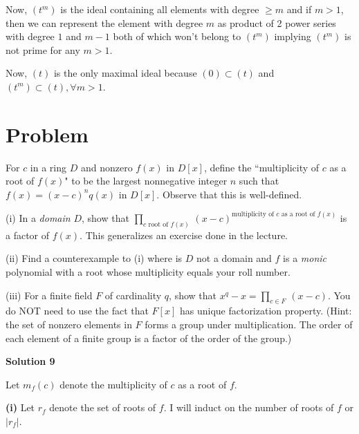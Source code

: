 \documentclass[12pt,a4paper]{article}
\theoremstyle{definition}
\begin{document}
\begin{flushleft}
\medskip

Now, $(t^m)$ is the ideal containing all elements with degree $\ge m$ and if $m >1$, then we can represent the element with degree $m$ as product of 2 power series with degree $1$ and $m-1$ both of which won't belong to $(t^m)$ implying $(t^m)$ is not prime for any $m>1$.

\medskip

Now, $(t)$ is the only maximal ideal because $(0) \subset (t)$ and $(t^m) \subset (t),\forall m > 1$.

\newpage

\setcounter{section}{8}
\section{Problem}

For $c$ in a ring $D$ and nonzero $f(x)$ in $D[x]$, define the ``multiplicity of $c$ as a root of $f(x)$" to be the largest nonnegative integer $n$ such that $f(x) = (x-c)^n q(x)$ in $D[x]$. Observe that this is well-defined. 

\medskip

(i) In a {\it domain} $D$, show that $\prod_{c \text { root of } f(x)} \, (x - c )^{\text {multiplicity of } c \text { as a root of } f(x)}$ is a factor of  $f(x)$. This generalizes an exercise done in the lecture.

\medskip
	
(ii) Find a counterexample to (i) where is $D$ not a domain and $f$ is a {\it monic} polynomial with a root whose multiplicity equals your roll number.

\medskip

(iii)	For a finite field $F$ of cardinality $q$, show that $x^q - x  = \prod_{c \in F} \, (x - c)$. You do NOT need to use the fact that $F[x]$ has unique factorization property. (Hint: the set of nonzero elements in $F$ forms a group under multiplication. The order of each element of a finite group is a factor of the order of the group.)

\bigskip

{\bf Solution 9}

\medskip

Let $m_f(c)$ denote the multiplicity of $c$ as a root of $f$.

\medskip

{\bf (i)} Let $r_f$ denote the set of roots of $f$. I will induct on the number of roots of $f$ or $|r_f|$.

\medskip


\end{flushleft}
\end{document}

